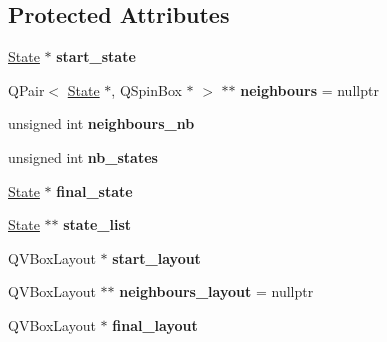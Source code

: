\subsection*{Protected Attributes}
\begin{DoxyCompactItemize}
\item 
\mbox{\label{class_transition_ad00c70980c06e901243991892265cd9d}} 
\mbox{\hyperlink{class_state}{State}} $\ast$ {\bfseries start\+\_\+state}
\item 
\mbox{\label{class_transition_a8f7d22e70f5f0b4b946e2ef2e957c9a3}} 
Q\+Pair$<$ \mbox{\hyperlink{class_state}{State}} $\ast$, Q\+Spin\+Box $\ast$ $>$ $\ast$$\ast$ {\bfseries neighbours} = nullptr
\item 
\mbox{\label{class_transition_a9e46a8f04b5d6972df177eefe026a095}} 
unsigned int {\bfseries neighbours\+\_\+nb}
\item 
\mbox{\label{class_transition_ab8ef139a26b18b812ad8966d2ac76e68}} 
unsigned int {\bfseries nb\+\_\+states}
\item 
\mbox{\label{class_transition_afc34ab37fb66f94c87a04be860c10d36}} 
\mbox{\hyperlink{class_state}{State}} $\ast$ {\bfseries final\+\_\+state}
\item 
\mbox{\label{class_transition_a9d150f2f58f7c7c74b4090c427bc3b9d}} 
\mbox{\hyperlink{class_state}{State}} $\ast$$\ast$ {\bfseries state\+\_\+list}
\item 
\mbox{\label{class_transition_af1bc68bc0837c5e1055e8bb802e15afb}} 
Q\+V\+Box\+Layout $\ast$ {\bfseries start\+\_\+layout}
\item 
\mbox{\label{class_transition_a0006ae58e9ab30c26c89602a65b5e1cc}} 
Q\+V\+Box\+Layout $\ast$$\ast$ {\bfseries neighbours\+\_\+layout} = nullptr
\item 
\mbox{\label{class_transition_a7f8566abdfae9b519ab432684f029fa9}} 
Q\+V\+Box\+Layout $\ast$ {\bfseries final\+\_\+layout}
\item 
\mbox{\label{class_transition_a82b612b7325fc1f299a8a1fbfdd03a1f}} 
$$
\end{DoxyCompactItemize}
